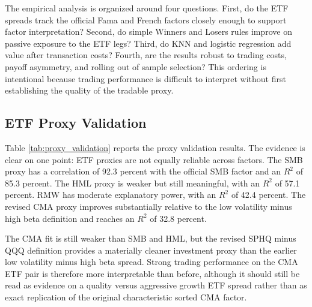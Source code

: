 \documentclass[investment,article,submit,pdftex,moreauthors]{Definitions/mdpi}
\begin{document}
The empirical analysis is organized around four questions. First, do the ETF spreads track the official Fama and French factors closely enough to support factor interpretation? Second, do simple Winners and Losers rules improve on passive exposure to the ETF legs? Third, do KNN and logistic regression add value after transaction costs? Fourth, are the results robust to trading costs, payoff asymmetry, and rolling out of sample selection? This ordering is intentional because trading performance is difficult to interpret without first establishing the quality of the tradable proxy.

\subsection{ETF Proxy Validation}

Table \ref{tab:proxy_validation} reports the proxy validation results. The evidence is clear on one point: ETF proxies are not equally reliable across factors. The SMB proxy has a correlation of 92.3 percent with the official SMB factor and an \(R^2\) of 85.3 percent. The HML proxy is weaker but still meaningful, with an \(R^2\) of 57.1 percent. RMW has moderate explanatory power, with an \(R^2\) of 42.4 percent. The revised CMA proxy improves substantially relative to the low volatility minus high beta definition and reaches an \(R^2\) of 32.8 percent.

\begin{table}[H]
\centering
\caption{Validation of ETF proxies against Fama and French factors}
\label{tab:proxy_validation}
\scriptsize
{}
\end{table}

The CMA fit is still weaker than SMB and HML, but the revised SPHQ minus QQQ definition provides a materially cleaner investment proxy than the earlier low volatility minus high beta spread. Strong trading performance on the CMA ETF pair is therefore more interpretable than before, although it should still be read as evidence on a quality versus aggressive growth ETF spread rather than as exact replication of the original characteristic sorted CMA factor.
\end{document}
